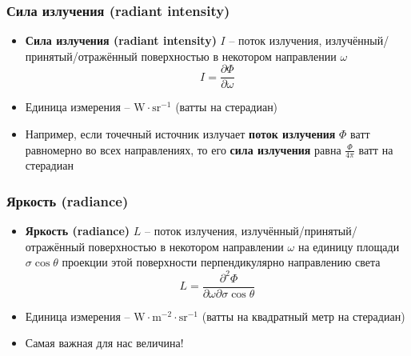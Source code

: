 \documentclass[10pt]{beamer}
\begin{document}
\begin{frame}
\frametitle{Сила излучения (radiant intensity)}
\begin{itemize}
\item \textbf{Сила излучения (radiant intensity)} \begin{math}I\end{math} -- поток излучения, излучённый/принятый/отражённый поверхностью в некотором направлении \begin{math}\omega\end{math}
\begin{equation*}
I = \frac{\partial \Phi}{\partial \omega}
\end{equation*}
\pause
\item Единица измерения -- \begin{math}\text{W}\cdot \text{sr}^{-1}\end{math} (ватты на стерадиан)
\pause
\item Например, если точечный источник излучает \textbf{поток излучения} \begin{math}\Phi\end{math} ватт равномерно во всех направлениях, то его \textbf{сила излучения} равна \begin{math}\frac{\Phi}{4\pi}\end{math} ватт на стерадиан
\end{itemize}
\end{frame}

\begin{frame}
\frametitle{Яркость (radiance)}
\begin{itemize}
\item \textbf{Яркость (radiance)} \begin{math}L\end{math} -- поток излучения, излучённый/принятый/отражённый поверхностью в некотором направлении \begin{math}\omega\end{math} на единицу площади \begin{math}\sigma\cos\theta\end{math} проекции этой поверхности перпендикулярно направлению света
\begin{equation*}
L = \frac{\partial^2 \Phi}{\partial \omega \partial \sigma \cos \theta}
\end{equation*}
\pause
\item Единица измерения -- \begin{math}\text{W}\cdot \text{m}^{-2} \cdot \text{sr}^{-1}\end{math} (ватты на квадратный метр на стерадиан)
\pause
\item Самая важная для нас величина!
\end{itemize}
\end{frame}
\end{document}
